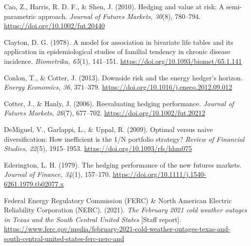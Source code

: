 \documentclass[11pt,letterpaper]{article}
\begin{document}
{\small\setlength{\parskip}{0pt}\hangindent=0.3in\noindent Cao, Z., Harris, R. D. F., \& Shen, J. (2010). Hedging and value at risk: A semi-parametric approach. \textit{Journal of Futures Markets, 30}(8), 780–794. \url{https://doi.org/10.1002/fut.20440}\par}

{\small\setlength{\parskip}{0pt}\hangindent=0.3in\noindent Clayton, D. G. (1978). A model for association in bivariate life tables and its application in epidemiological studies of familial tendency in chronic disease incidence. \textit{Biometrika, 65}(1), 141–151. \url{https://doi.org/10.1093/biomet/65.1.141}\par}

{\small\setlength{\parskip}{0pt}\hangindent=0.3in\noindent Conlon, T., \& Cotter, J. (2013). Downside risk and the energy hedger’s horizon. \textit{Energy Economics, 36}, 371–379. \url{https://doi.org/10.1016/j.eneco.2012.09.012}\par}

{\small\setlength{\parskip}{0pt}\hangindent=0.3in\noindent Cotter, J., \& Hanly, J. (2006). Reevaluating hedging performance. \textit{Journal of Futures Markets, 26}(7), 677–702. \url{https://doi.org/10.1002/fut.20212}\par}

{\small\setlength{\parskip}{0pt}\hangindent=0.3in\noindent DeMiguel, V., Garlappi, L., \& Uppal, R. (2009). Optimal versus naive diversification: How inefficient is the 1/N portfolio strategy? \textit{Review of Financial Studies, 22}(5), 1915–1953. \url{https://doi.org/10.1093/rfs/hhm075}\par}

{\small\setlength{\parskip}{0pt}\hangindent=0.3in\noindent Ederington, L. H. (1979). The hedging performance of the new futures markets. \textit{Journal of Finance, 34}(1), 157–170. \url{https://doi.org/10.1111/j.1540-6261.1979.tb02077.x}\par}

{\small\setlength{\parskip}{0pt}\hangindent=0.3in\noindent Federal Energy Regulatory Commission (FERC) \& North American Electric Reliability Corporation (NERC). (2021). \textit{The February 2021 cold weather outages in Texas and the South Central United States} [Staff report]. \url{https://www.ferc.gov/media/february-2021-cold-weather-outages-texas-and-south-central-united-states-ferc-nerc-and}\par}
\end{document}
